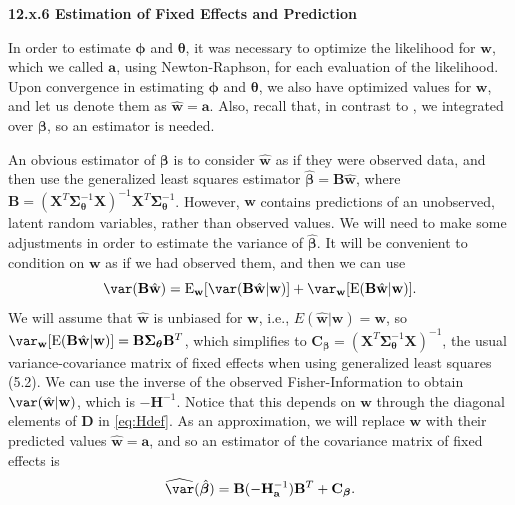 \documentclass[12pt, titlepage]{article}
\begin{document}
\vspace{.5cm}
{\large \flushleft \textbf{12.x.6 Estimation of Fixed Effects and Prediction}}
\vspace{.5cm}

In order to estimate $\boldsymbol{\phi}$ and $\boldsymbol{\theta}$, it was necessary to optimize the likelihood for $\mathbf{w}$, which we called $\mathbf{a}$, using Newton-Raphson, for each evaluation of the likelihood.  Upon convergence in estimating $\boldsymbol{\phi}$ and $\boldsymbol{\theta}$, we also have optimized values for $\mathbf{w}$, and let us denote them as $\hat{\mathbf{w}} = \mathbf{a}$.  Also, recall that, in contrast to \citet{bonat_practical_2016}, we integrated over $\boldsymbol{\beta}$, so an estimator is needed.

An obvious estimator of $\boldsymbol{\beta}$ is to consider $\hat{\mathbf{w}}$ as if they were observed data, and then use the generalized least squares estimator $\hat{\boldsymbol{\beta}} = \mathbf{B}\hat{\mathbf{w}}$, where $\mathbf{B} = (\mathbf{X}^{T}\boldsymbol{\Sigma}_{\boldsymbol{\theta}}^{-1}\mathbf{X})^{-1}\mathbf{X}^{T}\boldsymbol{\Sigma}_{\boldsymbol{\theta}}^{-1}$.  However, $\mathbf{w}$ contains predictions of an unobserved, latent random variables, rather than observed values.  We will need to make some adjustments in order to estimate the variance of $\hat{\boldsymbol{\beta}}$.  It will be convenient to condition on $\mathbf{w}$ as if we had observed them, and then we can use
$$
\var(\mathbf{B}\hat{\mathbf{w}}) = \textrm{E}_{\mathbf{w}}[\var(\mathbf{B}\hat{\mathbf{w}}|\mathbf{w})] + \var_{\mathbf{w}}[\textrm{E}(\mathbf{B}\hat{\mathbf{w}}|\mathbf{w})].
$$
We will assume that $\hat{\mathbf{w}}$ is unbiased for $\mathbf{w}$, i.e., $E(\hat{\mathbf{w}}|\mathbf{w}) = \mathbf{w}$, so $\var_{\mathbf{w}}[\textrm{E}(\mathbf{B}\hat{\mathbf{w}}|\mathbf{w})] = \mathbf{B}\boldsymbol{\Sigma_{\boldsymbol{\theta}}}\mathbf{B}^{T}$, which simplifies to $\mathbf{C}_{\boldsymbol{\beta}} = (\mathbf{X}^{T}\boldsymbol{\Sigma}_{\boldsymbol{\theta}}^{-1}\mathbf{X})^{-1}$, the usual variance-covariance matrix of fixed effects when using generalized least squares (5.2). We can use the inverse of the observed Fisher-Information to obtain $\var(\hat{\mathbf{w}}|\mathbf{w})$, which is $-\mathbf{H}^{-1}$.  Notice that this depends on $\mathbf{w}$ through the diagonal elements of $\mathbf{D}$ in \eqref{eq:Hdef}.  As an approximation, we will replace $\mathbf{w}$ with their predicted values $\hat{\mathbf{w}} = \mathbf{a}$, and so an estimator of the covariance matrix of fixed effects is
\begin{equation} \label{eq:sglmm_varfe}
\widehat{\var}(\hat{\boldsymbol{\beta}}) = \mathbf{B}(-\mathbf{H}_{\mathbf{a}}^{-1})\mathbf{B}^{T} + \mathbf{C}_{\boldsymbol{\beta}}.
\end{equation}
\end{document}
